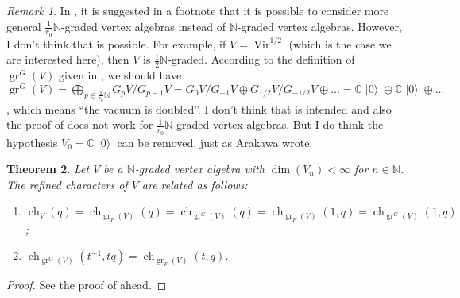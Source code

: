 \documentclass[a4paper, 12pt, reqno]{amsart}
\newtheorem{theorem}{Theorem}[section]
\theoremstyle{remark}
\newtheorem{remark}[theorem]{Remark}
\numberwithin{equation}{subsection}
\DeclareMathOperator{\Vir}{Vir}
\DeclareMathOperator{\gr}{gr}
\DeclareMathOperator{\ch}{ch}
\DeclareMathOperator{\vac}{|0\rangle}
\begin{document}
\begin{remark}
  \label{rmk:31}
  In \cite{arakawa_remark_2012}, it is suggested in a footnote that it is possible to consider more general $\tfrac{1}{r_0}\mathbb{N}$-graded vertex algebras instead of $\mathbb{N}$-graded vertex algebras.
  However, I don't think that is possible.
  For example, if $V = \Vir^{1/2}$ (which is the case we are interested here), then $V$ is $\tfrac{1}{2}\mathbb{N}$-graded.
  According to the definition of $\gr^G(V)$ given in \cite{arakawa_remark_2012}, we should have $\gr^G(V) = \bigoplus_{p \in \tfrac{1}{r_0}\mathbb{N}}G_pV/G_{p - 1}V = G_0V/G_{-1}V \oplus G_{1/2}V/G_{-1/2}V \oplus \dots = \mathbb{C}\vac \oplus \mathbb{C}\vac \oplus \dots$, which means ``the vacuum is doubled''.
  I don't think that is intended and also the proof of \cite[Proposition 2.6.1]{arakawa_remark_2012} does not work for $\tfrac{1}{r_0}\mathbb{N}$-graded vertex algebras.
  But I do think the hypothesis $V_0 = \mathbb{C}\vac$ can be removed, just as Arakawa wrote.
\end{remark}

\begin{theorem}
  \label{thr:47}
  Let $V$ be a $\mathbb{N}$-graded vertex algebra with $\dim(V_n) < \infty$ for $n \in \mathbb{N}$.
  The refined characters of $V$ are related as follows:
  \begin{enumerate}
  \item $\ch_V(q) = \ch_{\gr_F(V)}(q) = \ch_{\gr^G(V)}(q) = \ch_{\gr_F(V)}(1, q) = \ch_{\gr^G(V)}(1, q)$;
  \item $\ch_{\gr^G(V)}(t^{-1}, tq) = \ch_{\gr_F(V)}(t, q)$.
  \end{enumerate}
\end{theorem}

\begin{proof}
  See the proof of  ahead.
\end{proof}
\end{document}
